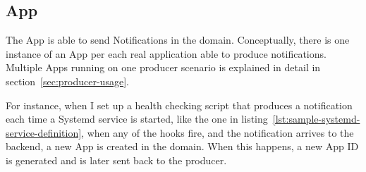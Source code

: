 \subsection{App}\label{sec:app}

The App is able to send Notifications
in the domain.
Conceptually,
there is one instance of an App
per each real application
able to produce notifications.
Multiple Apps running on one producer scenario
is explained in detail in section~\ref{sec:producer-usage}.

For instance,
when I set up a health checking script
that produces a notification each time
a Systemd service is started,
like the one in listing~\ref{lst:sample-systemd-service-definition},
when any of the hooks fire,
and the notification arrives to the backend,
a new App is created in the domain.
When this happens,
a new App \ac{ID} is generated
and is later sent back to the producer.
